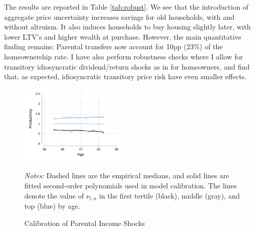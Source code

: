 \documentclass[12pt]{article}
\begin{document}
The results are reported in Table \ref{tab:robust}. We see that the introduction of aggregate price uncertainty increases savings for old households, with and without altruism. It also induces households to buy housing slightly later, with lower LTV's and higher wealth at purchase. However, the main quantitative finding remains: Parental transfers now account for 10pp (23\%) of the homeownership rate. I have also perform robustness checks where I allow for transitory idiosyncratic dividend/return shocks as in \cite{Chang2024} for homeowners, and find that, as expected, idiosyncratic transitory price risk have even smaller effects.



\begin{figure}
    \caption{Calibration of Parental Income Shocks}\label{fig:nu}
	{\centering
    \includegraphics[width=0.45\textwidth]{../tabfig/empirical/lifecycleproductivity_old_3}
    \par}    {\begin{footnotesize} \textit{Notes:}
        Dashed lines are the empirical medians, and solid lines are fitted second-order polynomials used in model calibration. The lines denote the value of $\nu_{i,a}$ in the first tertile (black), middle (gray), and top (blue) by age.
    \end{footnotesize}}
\end{figure}


\begin{table}
	\center 
\end{table}
\end{document}
